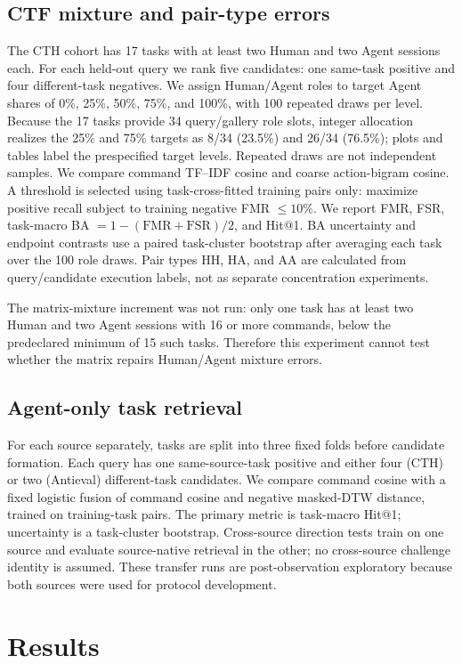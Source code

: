 \documentclass[11pt]{article}
\begin{document}
\subsection{CTF mixture and pair-type errors}
The CTH cohort has 17 tasks with at least two Human and two Agent sessions each. For each held-out query we rank five candidates: one same-task positive and four different-task negatives. We assign Human/Agent roles to target Agent shares of 0\%, 25\%, 50\%, 75\%, and 100\%, with 100 repeated draws per level. Because the 17 tasks provide 34 query/gallery role slots, integer allocation realizes the 25\% and 75\% targets as 8/34 (23.5\%) and 26/34 (76.5\%); plots and tables label the prespecified target levels. Repeated draws are not independent samples. We compare command TF--IDF cosine and coarse action-bigram cosine. A threshold is selected using task-cross-fitted training pairs only: maximize positive recall subject to training negative FMR $\leq10\%$. We report FMR, FSR, task-macro BA $=1-(\mathrm{FMR}+\mathrm{FSR})/2$, and Hit@1. BA uncertainty and endpoint contrasts use a paired task-cluster bootstrap after averaging each task over the 100 role draws. Pair types HH, HA, and AA are calculated from query/candidate execution labels, not as separate concentration experiments.

The matrix-mixture increment was not run: only one task has at least two Human and two Agent sessions with 16 or more commands, below the predeclared minimum of 15 such tasks. Therefore this experiment cannot test whether the matrix repairs Human/Agent mixture errors.

\subsection{Agent-only task retrieval}
For each source separately, tasks are split into three fixed folds before candidate formation. Each query has one same-source-task positive and either four (CTH) or two (Antieval) different-task candidates. We compare command cosine with a fixed logistic fusion of command cosine and negative masked-DTW distance, trained on training-task pairs. The primary metric is task-macro Hit@1; uncertainty is a task-cluster bootstrap. Cross-source direction tests train on one source and evaluate source-native retrieval in the other; no cross-source challenge identity is assumed. These transfer runs are post-observation exploratory because both sources were used for protocol development.

\section{Results}
\end{document}
